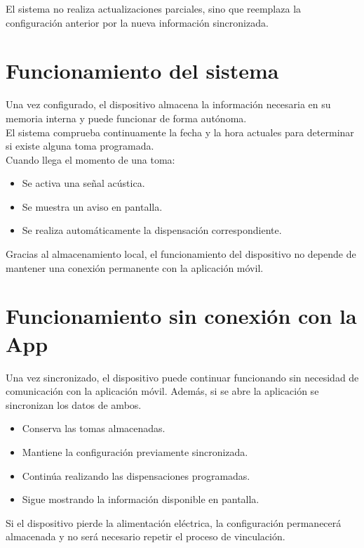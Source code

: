 El sistema no realiza actualizaciones parciales, sino que reemplaza la configuración anterior por la nueva información sincronizada.

\section{Funcionamiento del sistema}

Una vez configurado, el dispositivo almacena la información necesaria en su memoria interna y puede funcionar de forma autónoma.\\

El sistema comprueba continuamente la fecha y la hora actuales para determinar si existe alguna toma programada.\\

Cuando llega el momento de una toma:

\begin{itemize}
\item Se activa una señal acústica.
\item Se muestra un aviso en pantalla.
\item Se realiza automáticamente la dispensación correspondiente.
\end{itemize}

Gracias al almacenamiento local, el funcionamiento del dispositivo no depende de mantener una conexión permanente con la aplicación móvil.

\section{Funcionamiento sin conexión con la App}

Una vez sincronizado, el dispositivo puede continuar funcionando sin necesidad de comunicación con la aplicación móvil. Además, si se abre la aplicación se sincronizan los datos de ambos.

\begin{itemize}
\item Conserva las tomas almacenadas.
\item Mantiene la configuración previamente sincronizada.
\item Continúa realizando las dispensaciones programadas.
\item Sigue mostrando la información disponible en pantalla.
\end{itemize}

Si el dispositivo pierde la alimentación eléctrica, la configuración permanecerá almacenada y no será necesario repetir el proceso de vinculación.\\

